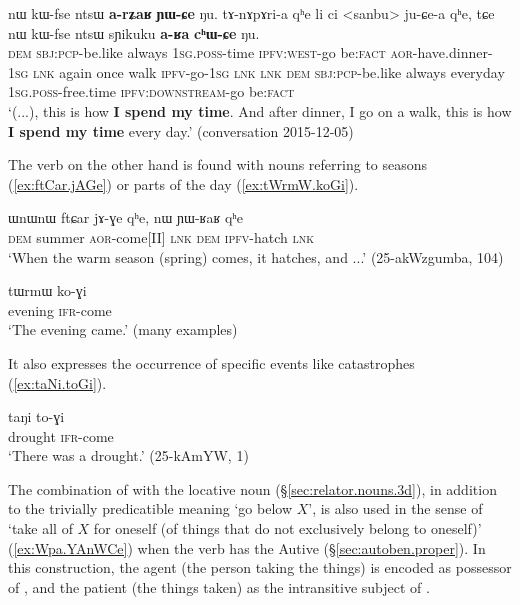 \begin{exe}
\ex \label{ex:aRa.ChWCe}
\gll nɯ kɯ-fse ntsɯ \textbf{a-rʑaʁ} \textbf{ɲɯ-ɕe} ŋu. tɤ-nɤpɤri-a qʰe li ci <sanbu> ju-ɕe-a qʰe, tɕe nɯ kɯ-fse ntsɯ sɲikuku \textbf{a-ʁa} \textbf{cʰɯ-ɕe} ŋu. \\
\textsc{dem} \textsc{sbj}:\textsc{pcp}-be.like always \textsc{1sg}.\textsc{poss}-time \textsc{ipfv}:\textsc{west}-go be:\textsc{fact} \textsc{aor}-have.dinner-\textsc{1sg} \textsc{lnk} again once walk \textsc{ipfv}-go-\textsc{1sg} \textsc{lnk} \textsc{lnk} \textsc{dem} \textsc{sbj}:\textsc{pcp}-be.like always everyday \textsc{1sg}.\textsc{poss}-free.time \textsc{ipfv}:\textsc{downstream}-go be:\textsc{fact} \\
\glt `(...), this is how \textbf{I spend my time}. And after dinner, I go on a walk, this is how \textbf{I spend my time} every day.' (conversation 2015-12-05)
\end{exe}
 
 The verb  on the other hand is found with nouns referring to seasons (\ref{ex:ftCar.jAGe}) or parts of the day (\ref{ex:tWrmW.koGi}).
 
\begin{exe}
\ex \label{ex:ftCar.jAGe}
\gll  ɯnɯnɯ ftɕar jɤ-ɣe qʰe, nɯ ɲɯ-ʁaʁ qʰe \\
\textsc{dem} summer \textsc{aor}-come[II] \textsc{lnk} \textsc{dem} \textsc{ipfv}-hatch \textsc{lnk} \\
\glt `When the warm season (spring) comes, it hatches, and ...' (25-akWzgumba, 104)
\end{exe}

\begin{exe}
\ex \label{ex:tWrmW.koGi}
\gll tɯrmɯ ko-ɣi  \\
evening \textsc{ifr}-come \\
\glt `The evening came.' (many examples)
\end{exe}

It also expresses the occurrence of  specific events like catastrophes (\ref{ex:taNi.toGi}).

\begin{exe}
\ex \label{ex:taNi.toGi}
\gll taŋi to-ɣi \\
drought \textsc{ifr}-come \\
\glt `There was a drought.' (25-kAmYW, 1)
\end{exe}

The combination of  with the locative noun  (§\ref{sec:relator.nouns.3d}), in addition to the trivially predicatible meaning `go below $X$', is also used in the sense of `take all of $X$ for oneself (of things that do not exclusively belong to oneself)' (\ref{ex:Wpa.YAnWCe}) when the verb has the Autive  (§\ref{sec:autoben.proper}). In this construction, the agent (the person taking the things) is encoded as possessor of , and the patient (the things taken) as the intransitive subject of .


